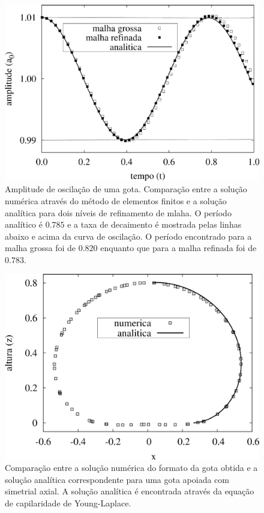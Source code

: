 \documentclass[a4paper,portuges]{article}
\begin{document}
 \begin{figure}[ht!]
 	\begin{center}
 		\includegraphics[angle=0, scale=0.5]{figs/oscillating.pdf}
 	\end{center}
	\caption{Amplitude de oscilação de uma gota. Comparação entre a
	solução numérica através do método de elementos finitos e a solução
	analítica para dois níveis de refinamento de mlaha. O período
	analítico é $0.785$ e a taxa de decaimento é mostrada pelas linhas
	abaixo e acima da curva de oscilação. O período encontrado para a
	malha grossa foi de $0.820$ enquanto que para a malha refinada foi
	de $0.783$.}
 	\label{fig:oscillating} 
 \end{figure}

 \begin{figure}[ht!]
 	\begin{center}
 		\includegraphics[angle=0, scale=0.5]{figs/sessileShape.pdf}
 	\end{center}
	\caption{Comparação entre a solução numérica do formato da gota
	obtida e a solução
	analítica correspondente para uma gota apoiada com simetrial axial.
	A solução analítica é encontrada através da equação de capilaridade
	de Young-Laplace.}
 	\label{fig:sessile} 
 \end{figure}
\end{document}

